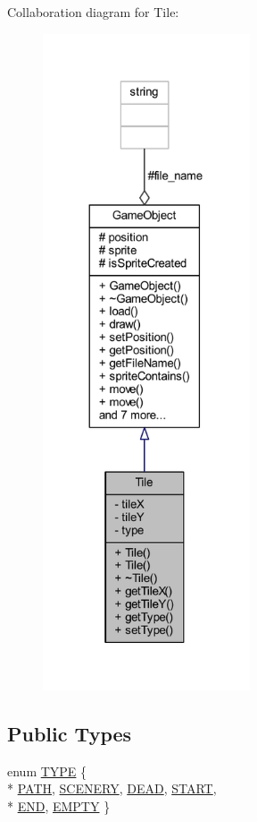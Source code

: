 Collaboration diagram for Tile\+:\nopagebreak
\begin{figure}[H]
\begin{center}
\leavevmode
\includegraphics[height=550pt]{class_tile__coll__graph}
\end{center}
\end{figure}
\subsection*{Public Types}
\begin{DoxyCompactItemize}
\item 
enum \hyperlink{class_tile_acb53d82f9dacff45a98acc63276928eb}{T\+Y\+P\+E} \{ \\*
\hyperlink{class_tile_acb53d82f9dacff45a98acc63276928eba9001b4829dca656f3c100d3a8069a466}{P\+A\+T\+H}, 
\hyperlink{class_tile_acb53d82f9dacff45a98acc63276928eba669ab57a19953e968fa340f2ee96962a}{S\+C\+E\+N\+E\+R\+Y}, 
\hyperlink{class_tile_acb53d82f9dacff45a98acc63276928ebab89feda40ad0da6fef5e8c0b9ee76410}{D\+E\+A\+D}, 
\hyperlink{class_tile_acb53d82f9dacff45a98acc63276928ebae07eb3a350a6654b081757585cd76e07}{S\+T\+A\+R\+T}, 
\\*
\hyperlink{class_tile_acb53d82f9dacff45a98acc63276928ebabe602dcbe043275048d7cb0f2df6c2db}{E\+N\+D}, 
\hyperlink{class_tile_acb53d82f9dacff45a98acc63276928eba410bd5c2074558a74ff688ff43723296}{E\+M\+P\+T\+Y}
 \}
\end{DoxyCompactItemize}
